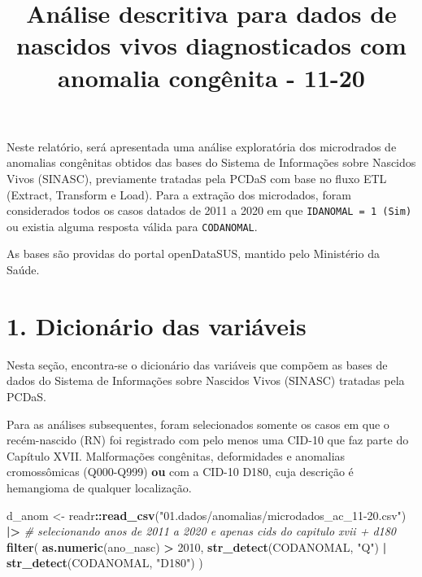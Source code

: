\documentclass[
]{article}
\title{Análise descritiva para dados de nascidos vivos diagnosticados
com anomalia congênita - 11-20}
\author{}
\date{\vspace{-2.5em}}
\newenvironment{Shaded}{\begin{snugshade}}{\end{snugshade}}
\newcommand{\CommentTok}[1]{\textcolor[rgb]{0.56,0.35,0.01}{\textit{#1}}}
\newcommand{\DecValTok}[1]{\textcolor[rgb]{0.00,0.00,0.81}{#1}}
\newcommand{\FunctionTok}[1]{\textcolor[rgb]{0.13,0.29,0.53}{\textbf{#1}}}
\newcommand{\NormalTok}[1]{#1}
\newcommand{\OtherTok}[1]{\textcolor[rgb]{0.56,0.35,0.01}{#1}}
\newcommand{\SpecialCharTok}[1]{\textcolor[rgb]{0.81,0.36,0.00}{\textbf{#1}}}
\newcommand{\StringTok}[1]{\textcolor[rgb]{0.31,0.60,0.02}{#1}}
\begin{document}
\maketitle

{
\setcounter{tocdepth}{1}
\tableofcontents
}
Neste relatório, será apresentada uma análise exploratória dos
microdrados de anomalias congênitas obtidos das bases do Sistema de
Informações sobre Nascidos Vivos (SINASC), previamente tratadas pela
PCDaS com base no fluxo ETL (Extract, Transform e Load). Para a extração
dos microdados, foram considerados todos os casos datados de 2011 a 2020
em que \texttt{IDANOMAL\ =\ 1\ (Sim)} ou existia alguma resposta válida
para \texttt{CODANOMAL}.

As bases são providas do portal openDataSUS, mantido pelo Ministério da
Saúde.

\newpage

\hypertarget{dicionuxe1rio-das-variuxe1veis}{%
\section{1. Dicionário das
variáveis}\label{dicionuxe1rio-das-variuxe1veis}}

Nesta seção, encontra-se o dicionário das variáveis que compõem as bases
de dados do Sistema de Informações sobre Nascidos Vivos (SINASC)
tratadas pela PCDaS.

Para as análises subsequentes, foram selecionados somente os casos em
que o recém-nascido (RN) foi registrado com pelo menos uma CID-10 que
faz parte do Capítulo XVII. Malformações congênitas, deformidades e
anomalias cromossômicas (Q000-Q999) \textbf{ou} com a CID-10 D180, cuja
descrição é hemangioma de qualquer localização.

\begin{Shaded}
\begin{Highlighting}[]
\NormalTok{d\_anom }\OtherTok{\textless{}{-}}\NormalTok{ readr}\SpecialCharTok{::}\FunctionTok{read\_csv}\NormalTok{(}\StringTok{"01.dados/anomalias/microdados\_ac\_11{-}20.csv"}\NormalTok{) }\SpecialCharTok{|\textgreater{}} 
  \CommentTok{\# selecionando anos de 2011 a 2020 e apenas cids do capitulo xvii + d180}
  \FunctionTok{filter}\NormalTok{(}
    \FunctionTok{as.numeric}\NormalTok{(ano\_nasc) }\SpecialCharTok{\textgreater{}} \DecValTok{2010}\NormalTok{,}
    \FunctionTok{str\_detect}\NormalTok{(CODANOMAL, }\StringTok{"Q"}\NormalTok{) }\SpecialCharTok{|} \FunctionTok{str\_detect}\NormalTok{(CODANOMAL, }\StringTok{"D180"}\NormalTok{)}
\NormalTok{ )}
\end{Highlighting}
\end{Shaded}
\end{document}
